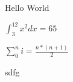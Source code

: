 \documentclass{article}
\begin{document}
Hello World



$\int_3^12x^2 dx = 65$

\hspace*{1ex}
$\displaystyle{\sum_0^n i = \frac{n*(n+1)}{2}}$

sdfg
\end{document}
